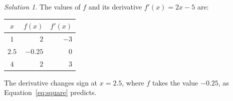 \documentclass[11pt, a4paper]{article}
\theoremstyle{definition}
\theoremstyle{remark}
\newtheorem*{solution}{Solution}
\begin{document}
\begin{solution}
The values of $f$ and its derivative $f'(x) = 2x - 5$ are:
\begin{center}
  \begin{tabular}{crr}
    \toprule
    $x$ & $f(x)$ & $f'(x)$ \\
    \midrule
    $1$ & $2$ & $-3$ \\
    $2.5$ & $-0.25$ & $0$ \\
    $4$ & $2$ & $3$ \\
    \bottomrule
  \end{tabular}
\end{center}
The derivative changes sign at $x = 2.5$, where $f$ takes the value
$-0.25$, as Equation~\eqref{eq:square} predicts.
\end{solution}
\end{document}
